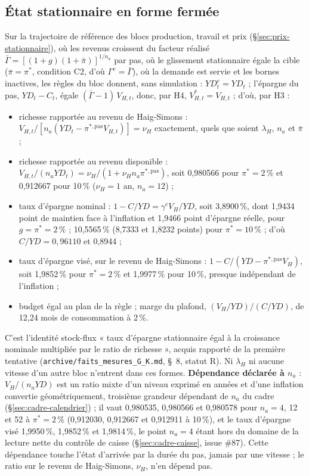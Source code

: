 \documentclass[11pt,a4paper]{article}
\begin{document}
\subsection{État stationnaire en forme fermée}
\label{sec:menages-stationnaire}
\begin{proposee}
Sur la trajectoire de référence des blocs production, travail et prix (\S\ref{sec:prix-stationnaire}), où les revenus croissent du facteur réalisé $\bar\Gamma = [(1 + g)(1 + \bar\pi)]^{1/n_a}$ par pas, où le glissement stationnaire égale la cible ($\bar\pi = \pi^\ast$, condition C2, d'où $\Gamma^e = \bar\Gamma$), où la demande est servie et les bornes inactives, les règles du bloc donnent, sans simulation : $\mathit{YD}^e_t = \mathit{YD}_t$ ; l'épargne du pas, $\mathit{YD}_t - C_t$, égale $(\bar\Gamma - 1)\,V_{H,t}$, donc, par H4, $V^\ast_{H,t} = V_{H,t}$ ; d'où, par H3 :
\begin{itemize}
\item richesse rapportée au revenu de Haig-Simons : $V_{H,t}/[n_a(\mathit{YD}_t - \pi^{\ast,\mathrm{pas}} V_{H,t})] = \nu_H$ exactement, quels que soient $\lambda_H$, $n_a$ et $\bar\pi$ ;
\item richesse rapportée au revenu disponible : $V_{H,t}/(n_a \mathit{YD}_t) = \nu_H/(1 + \nu_H n_a \pi^{\ast,\mathrm{pas}})$, soit 0,980566 pour $\pi^\ast = 2\,\%$ et 0,912667 pour 10\,\% ($\nu_H = 1$ an, $n_a = 12$) ;
\item taux d'épargne nominal : $1 - C/\mathit{YD} = \gamma^e V_H/\mathit{YD}$, soit 3,8900\,\%, dont 1,9434 point de maintien face à l'inflation et 1,9466 point d'épargne réelle, pour $g = \pi^\ast = 2\,\%$ ; 10,5565\,\% (8,7333 et 1,8232 points) pour $\pi^\ast = 10\,\%$ ; d'où $C/\mathit{YD} = 0{,}96110$ et 0,8944 ;
\item taux d'épargne visé, sur le revenu de Haig-Simons : $1 - C/(\mathit{YD} - \pi^{\ast,\mathrm{pas}} V_H)$, soit 1,9852\,\% pour $\pi^\ast = 2\,\%$ et 1,9977\,\% pour 10\,\%, presque indépendant de l'inflation ;
\item budget égal au plan de la règle ; marge du plafond, $(V_H/\mathit{YD})/(C/\mathit{YD})$, de 12,24 mois de consommation à 2\,\%.
\end{itemize}
C'est l'identité stock-flux « taux d'épargne stationnaire égal à la croissance nominale multipliée par le ratio de richesse », acquis rapporté de la première tentative (\nolinkurl{archive/faits_mesures_G_K.md}, \S~8, statut R). Ni $\lambda_H$ ni aucune vitesse d'un autre bloc n'entrent dans ces formes. \textbf{Dépendance déclarée à $n_a$} : $V_H/(n_a\mathit{YD})$ est un ratio mixte d'un niveau exprimé en années et d'une inflation convertie géométriquement, troisième grandeur dépendant de $n_a$ du cadre (\S\ref{sec:cadre-calendrier}) ; il vaut 0,980535, 0,980566 et 0,980578 pour $n_a = 4$, 12 et 52 à $\pi^\ast = 2\,\%$ (0,912030, 0,912667 et 0,912911 à 10\,\%), et le taux d'épargne visé 1,9950\,\%, 1,9852\,\% et 1,9814\,\%, le point $n_a = 4$ étant hors du domaine de la lecture nette du contrôle de caisse (\S\ref{sec:cadre-caisse}, issue \#87). Cette dépendance touche l'état d'arrivée par la durée du pas, jamais par une vitesse ; le ratio sur le revenu de Haig-Simons, $\nu_H$, n'en dépend pas.


\end{proposee}
\end{document}
